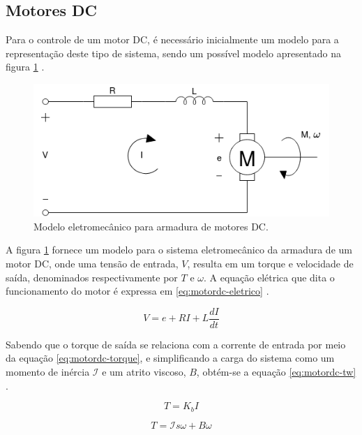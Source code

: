\subsection{Motores DC}
Para o controle de um motor DC, é necessário inicialmente um modelo
para a representação deste tipo de sistema, sendo um possível modelo 
apresentado na figura \ref{fig:motordc} \cite{krishnan2001electric} \cite{maheriya2016review}.

\begin{figure}[h]
    \caption{Modelo eletromecânico para armadura de motores DC.}    

    \begin{centering}
        \includegraphics[width=0.6\columnwidth]{images/fundamentos/MotorDC.png} 
    \par\end{centering}

    \label{fig:motordc}
\end{figure}

A figura \ref{fig:motordc} fornece um modelo para o sistema eletromecânico
da armadura de um motor DC, onde uma tensão de entrada, $V$, resulta 
em um torque e velocidade de saída, denominados respectivamente por 
$T$ e $\omega$. A equação elétrica que dita o funcionamento do motor
é expressa em \ref{eq:motordc-eletrico} \cite{krishnan2001electric}.

\begin{equation}
    \label{eq:motordc-eletrico}
    V = e + RI + L \frac{dI}{dt}
\end{equation}

Sabendo que o torque de saída se relaciona com a corrente de entrada
por meio da equação \ref{eq:motordc-torque}, e simplificando a carga
do sistema como um momento de inércia $\mathcal{I}$ e um atrito viscoso, $B$,
obtém-se a equação \ref{eq:motordc-tw} \cite{krishnan2001electric}.

\begin{equation}
    \label{eq:motordc-torque}
    T = K_b I
\end{equation}

\begin{equation}
    \label{eq:motordc-tw}
    T = \mathcal{I}s\omega + B\omega
\end{equation}


